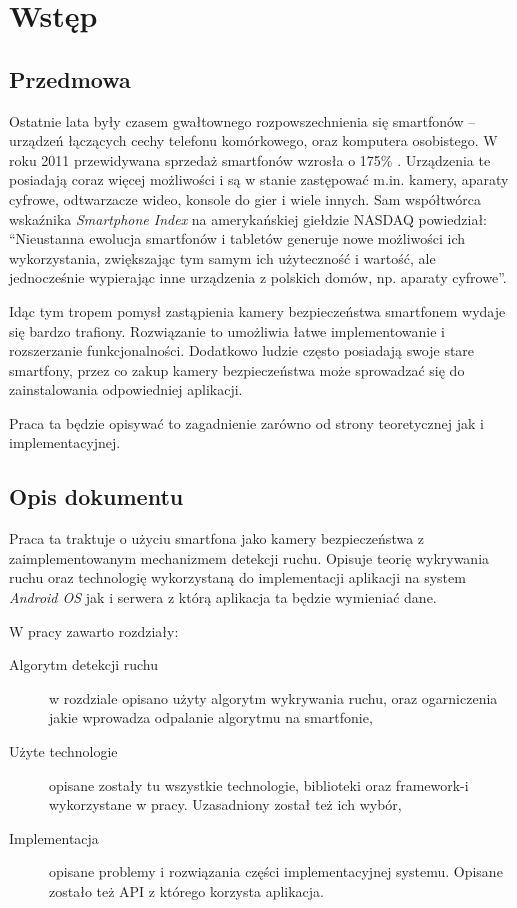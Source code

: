 \chapter{Wstęp}
\label{cha:wstęp}

\section{Przedmowa}
\label{sec:przedmowa}

Ostatnie lata były czasem gwałtownego rozpowszechnienia się smartfonów -- urządzeń łączących cechy telefonu komórkowego, oraz komputera osobistego. W roku 2011 przewidywana sprzedaż smartfonów wzrosła o 175\% \cite{Wwwsales}. Urządzenia te posiadają coraz więcej możliwości i są w stanie zastępować m.in. kamery, aparaty cyfrowe, odtwarzacze wideo, konsole do gier i wiele innych. Sam współtwórca wskaźnika {\it Smartphone Index} na amerykańskiej giełdzie NASDAQ powiedział: ``Nieustanna ewolucja smartfonów i tabletów generuje nowe możliwości ich wykorzystania, zwiększając tym samym ich użyteczność i wartość, ale jednocześnie wypierając inne urządzenia z polskich domów, np. aparaty cyfrowe''. 

Idąc tym tropem pomysł zastąpienia kamery bezpieczeństwa smartfonem wydaje się bardzo trafiony. Rozwiązanie to umożliwia łatwe implementowanie i rozszerzanie funkcjonalności. Dodatkowo ludzie często posiadają swoje stare smartfony, przez co zakup kamery bezpieczeństwa może sprowadzać się do zainstalowania odpowiedniej aplikacji. 

Praca ta będzie opisywać to zagadnienie zarówno od strony teoretycznej jak i implementacyjnej.

\section{Opis dokumentu}
\label{sec:opis dokumentu}

Praca ta traktuje o użyciu smartfona jako kamery bezpieczeństwa z zaimplementowanym mechanizmem detekcji ruchu. Opisuje teorię wykrywania ruchu oraz technologię wykorzystaną do implementacji aplikacji na system {\it Android OS} jak i serwera z którą aplikacja ta będzie wymieniać dane. 

W pracy zawarto rozdziały:
\begin{description}
	\item[Algorytm detekcji ruchu] w rozdziale opisano użyty algorytm wykrywania ruchu, oraz ogarniczenia jakie wprowadza odpalanie algorytmu na smartfonie,
	\item[Użyte technologie] opisane zostały tu wszystkie technologie, biblioteki oraz framework-i wykorzystane w pracy. Uzasadniony został też ich wybór,
	\item[Implementacja] opisane problemy i rozwiązania części implementacyjnej systemu. Opisane zostało też API z którego korzysta aplikacja. 
\end{description}

